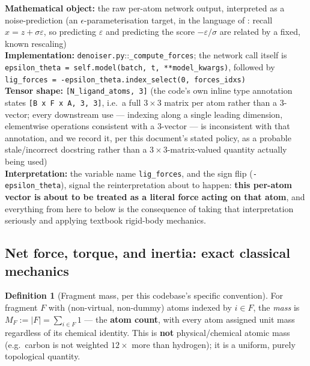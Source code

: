 \documentclass[11pt,a4paper]{report}
\theoremstyle{definition}
\newtheorem{definition}[definition]{Definition}
\theoremstyle{remark}
\newcommand{\file}[1]{\texttt{#1}}
\newcommand{\pyfunc}[1]{\texttt{#1}}
\newcommand{\shape}[1]{\texttt{[#1]}}
\begin{document}
\begin{codebox}
\textbf{Mathematical object:} the raw per-atom network output, interpreted
as a noise-prediction (an $\epsilon$-parameterisation target, in the
language of : recall
$x=z+\sigma\varepsilon$, so predicting $\varepsilon$ and predicting the
score $-\varepsilon/\sigma$ are related by a fixed, known rescaling) \\
\textbf{Implementation:} \file{denoiser.py}::\pyfunc{\_compute\_forces};
the network call itself is
\texttt{epsilon\_theta = self.model(batch, t, **model\_kwargs)}, followed
by \texttt{lig\_forces = -epsilon\_theta.index\_select(0, forces\_idxs)} \\
\textbf{Tensor shape:} \shape{N\_ligand\_atoms, 3} (the code's own inline
type annotation states \shape{B x F x A, 3, 3}, i.e.\ a full $3\times3$
matrix per atom rather than a $3$-vector; every downstream use --- indexing
along a single leading dimension, elementwise operations consistent with a
$3$-vector --- is inconsistent with that annotation, and we record it, per
this document's stated policy, as a probable stale/incorrect docstring
rather than a $3\times3$-matrix-valued quantity actually being used) \\
\textbf{Interpretation:} the variable name \texttt{lig\_forces}, and the
sign flip (\texttt{-epsilon\_theta}), signal the reinterpretation about to
happen: \textbf{this per-atom vector is about to be treated as a literal
force acting on that atom}, and everything from here to
 below is the consequence of taking that
interpretation seriously and applying textbook rigid-body mechanics.
\end{codebox}

\subsection{Net force, torque, and inertia: exact classical mechanics}

\begin{definition}[Fragment mass, per this codebase's specific convention]
\label{def:fragment-mass-precise}
For fragment $F$ with (non-virtual, non-dummy) atoms indexed by
$i\in F$, the \emph{mass} is
$M_F := |F| = \sum_{i\in F}1$ --- the \textbf{atom count}, with every atom
assigned unit mass regardless of its chemical identity. This is
\textbf{not} physical/chemical atomic mass (e.g.\ carbon is not weighted
$12\times$ more than hydrogen); it is a uniform, purely topological
quantity.
\end{definition}
\end{document}
